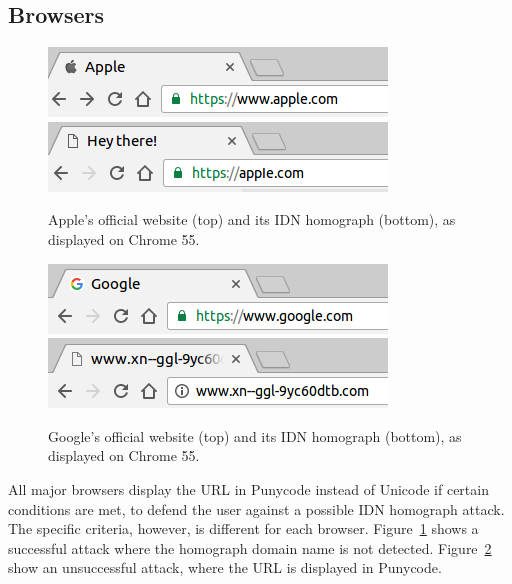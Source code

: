 \documentclass[letterpaper,twocolumn,10pt]{article}
\begin{document}
\subsection{Browsers}
\begin{figure}[t]
  \includegraphics[width=\linewidth]{images/apple}
  \includegraphics[width=\linewidth]{images/fakeapple-punycode}
  \centering
  \caption{Apple's official website (top) and its IDN homograph (bottom), as displayed on Chrome 55.}
  \label{screenshot-apple}
\end{figure}

\begin{figure}[t]
  \includegraphics[width=\linewidth]{images/google}
  \includegraphics[width=\linewidth]{images/fakegoogle-punycode}
  \centering
  \caption{Google's official website (top) and its IDN homograph (bottom), as displayed on Chrome 55.}
  \label{screenshot-google}
\end{figure}

All major browsers display the URL in Punycode instead of Unicode if certain conditions are met, to defend the user against a possible IDN homograph attack.
The specific criteria, however, is different for each browser.
Figure~\ref{screenshot-apple} shows a successful attack where the homograph domain name is not detected.
Figure~\ref{screenshot-google} show an unsuccessful attack, where the URL is displayed in Punycode.
\end{document}
